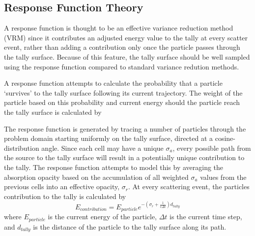 \documentclass[]{article}
\begin{document}
	\subsection{Response Function Theory}
		A response function is thought to be an effective variance reduction method (VRM) since it contributes an adjusted energy value to the tally at every scatter event, rather than adding a contribution only once the particle passes through the tally surface. Because of this feature, the tally surface should be well sampled using the response function compared to standard variance redution methods. 
		
		A response function attempts to calculate the probability that a particle `survives' to the tally surface following its current trajectory. The weight of the particle based on this probability and current energy should the particle reach the tally surface is calculated by
		
		The response function is generated by tracing a number of particles through the problem domain starting uniformly on the tally surface, directed at a cosine-distribution angle. Since each cell may have a unique $\sigma_{a}$, every possible path from the source to the tally surface will result in a potentially unique contribution to the tally. The response function attempts to model this by averaging the absorption opacity based on the accumulation of all weighted $\sigma_{a}$ values from the previous cells into an effective opacity, $\sigma_{r}$. At every scattering event, the particles contribution to the tally is calculated by
		\begin{equation}\label{Eq: tally_contr}
		E_{contribution} = E_{particle}e^{-(\sigma_{r} + \frac{1}{c \Delta t})d_{tally}}
		\end{equation}
		where $E_{particle}$ is the current energy of the particle, $\Delta t$ is the current time step, and $d_{tally}$ is the distance of the particle to the tally surface along its path. 
		
\end{document}
